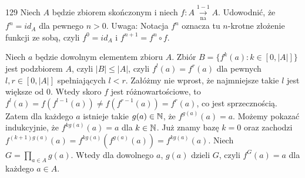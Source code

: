 \documentclass{../note}
\begin{document}
\begin{zadanie}{129}
Niech $A$ będzie zbiorem skończonym i niech $ f: A \underset{\text{na}}{\xrightarrow{1-1}} A $. Udowodnić, że $f^{n}=id_{A}$ dla pewnego $n>0$.
Uwaga: Notacja $f^{n}$ oznacza tu $n$-krotne złożenie funkcji ze sobą, czyli $f^{0}=id_{A}$ i $f^{n+1}=f^{n}\circ f$.
\end{zadanie}
\begin{rozwiazanie}
Niech $a$ będzie dowolnym elementem zbioru $A$. Zbiór $B = \{f^k(a) : k \in [0, |A|]\}$ jest podzbiorem $A$, czyli $|B| \leq |A|$, czyli $f^l(a) = f^r(a)$ dla pewnych $l, r \in [0, |A|]$ spełniających $l < r$. Załóżmy nie wprost, że najmniejsze takie $l$ jest większe od 0. Wtedy skoro $f$ jest różnowartościowe, to $f^l(a) = f(f^{l-1}(a)) \neq f(f^{r-1}(a)) = f^r(a)$, co jest sprzecznością. Zatem dla każdego $a$ istnieje takie $g(a) \in \mathbb{N}$, że $f^{g(a)}(a) = a$. Możemy pokazać indukcyjnie, że $f^{kg(a)}(a) = a$ dla $k \in \mathbb{N}$. Już znamy bazę $k = 0$ oraz zachodzi $f^{(k+1)g(a)}(a) = f^{kg(a)}(f^{g(a)}(a)) = f^{kg(a)}(a)$. Niech $G = \prod_{a\in A} g(a)$. Wtedy dla dowolnego $a$, $g(a)$ dzieli $G$, czyli $f^G(a) = a$ dla każdego $a \in A$.
\end{rozwiazanie}
\end{document}
